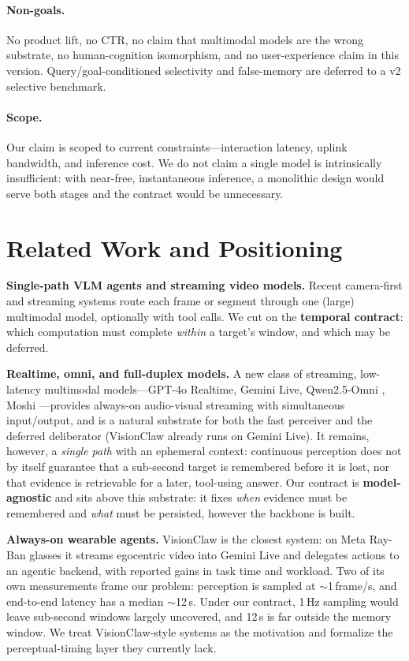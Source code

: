 \documentclass[11pt,a4paper]{article}
\begin{document}
\paragraph{Non-goals.} No product lift, no CTR, no claim that multimodal models are the wrong substrate, no human-cognition isomorphism, and no user-experience claim in this version. Query/goal-conditioned selectivity and false-memory are deferred to a v2 selective benchmark.

\paragraph{Scope.} Our claim is scoped to current constraints---interaction latency, uplink bandwidth, and inference cost. We do not claim a single model is intrinsically insufficient: with near-free, instantaneous inference, a monolithic design would serve both stages and the contract would be unnecessary.

\section{Related Work and Positioning}
\textbf{Single-path VLM agents and streaming video models.} Recent camera-first and streaming systems route each frame or segment through one (large) multimodal model, optionally with tool calls. We cut on the \textbf{temporal contract}: which computation must complete \emph{within} a target's window, and which may be deferred.

\textbf{Realtime, omni, and full-duplex models.} A new class of streaming, low-latency multimodal models---GPT-4o Realtime, Gemini Live, Qwen2.5-Omni \citep{qwen25omni2025}, Moshi \citep{moshi2024}---provides always-on audio-visual streaming with simultaneous input/output, and is a natural substrate for both the fast perceiver and the deferred deliberator (VisionClaw already runs on Gemini Live). It remains, however, a \emph{single path} with an ephemeral context: continuous perception does not by itself guarantee that a sub-second target is remembered before it is lost, nor that evidence is retrievable for a later, tool-using answer. Our contract is \textbf{model-agnostic} and sits above this substrate: it fixes \emph{when} evidence must be remembered and \emph{what} must be persisted, however the backbone is built.

\textbf{Always-on wearable agents.} VisionClaw \citep{liu2026visionclaw} is the closest system: on Meta Ray-Ban glasses it streams egocentric video into Gemini Live and delegates actions to an agentic backend, with reported gains in task time and workload. Two of its own measurements frame our problem: perception is sampled at $\sim$1\,frame/s, and end-to-end latency has a median $\sim$12\,s. Under our contract, 1\,Hz sampling would leave sub-second windows largely uncovered, and 12\,s is far outside the memory window. We treat VisionClaw-style systems as the motivation and formalize the perceptual-timing layer they currently lack.
\end{document}
